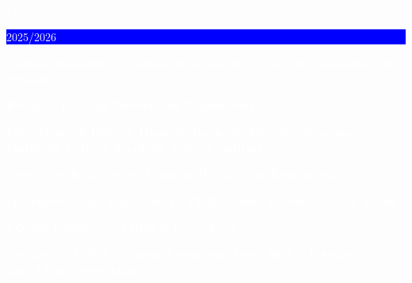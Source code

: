 \documentclass[a5paper, twoside]{article}
\begin{document}
\vspace*{\fill}


\noindent\hspace{-3pt}\textcolor{white}{\fontsize{25}{25} \Kapitan Průvodce prváka. \colorbox{blue}{\rule[5pt]{0pt}{15pt}\large 2025/2026}}

\vspace{1em}

\noindent\textcolor{white}{\textbf{Vydáno Studentským parlamentem Jarošky v září 2025 nákladem 130 výtisků.}}

\vspace{1em}

\noindent \textcolor{white}{\textbf{Redakce: Dominik Doležel, Jan Romanovský}}

\vspace{1em}

\noindent \textcolor{white}{\textbf{Foto: Dominik Doležel, Hana Trubačíková, Mgr. Bc. Jaroslava Maříková, Patricie Šperková, archivy institucí}}

\vspace{1em}

\noindent \textcolor{white}{\textbf{Sazba a grafická úprava: Dominik Doležel, Jan Romanovský}}

\vspace{1em}

\noindent \textcolor{white}{\textbf{Spolupráce: Mgr. Tomáš Nečas, Ph.D., Šimon Lopour, Vojtěch Vaněk}}

\vspace{1em}

\noindent \textcolor{white}{\textbf{Účelová publikace -- výtisk je neprodejný.}}

\vspace{1em}

\noindent \textcolor{white}{\textbf{Vysázeno v \LaTeX u s pomocí programů Paint.NET a Inkscape a s daty z OpenStreetMap.}}
\end{document}
